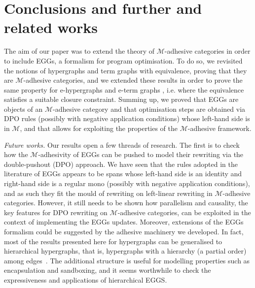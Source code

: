 \documentclass[3p]{elsarticle}
\theoremstyle{remark}
\theoremstyle{definition}
\begin{document}
\section{Conclusions and further and related works}
\label{conclusioni}
The aim of our paper was to extend the theory of $\mathcal{M}$-adhesive categories in order to include EGGs, 
a formalism for program optimisation. 
%
To do so, we revisited the notions of hypergraphs and term graphs with equivalence, 
proving that they are $\mathcal{M}$-adhesive categories, and we extended these results in order to
prove the same property for e-hypergraphs and e-term graphs , i.e. where the equivalence satisfies 
a suitable closure constraint.
Summing up, we proved that EGGs are objects of an $\mathcal{M}$-adhesive category
and that optimisation steps are obtained via DPO rules (possibly with negative application conditions) whose 
left-hand side is in $\mathcal{M}$,
and that allows for exploiting the properties 
of the $\mathcal{M}$-adhesive framework.

\emph{Future works.}
Our results open a few threads of research. The first is to check how the $\mathcal{M}$-adhesivity 
of EGGs can be pushed to model their rewriting via the double-pushout (DPO) approach. We have seen that 
the rules adopted in the literature of EGGs appears to be spans whose left-hand side is an identity and 
right-hand side is a regular mono (possibly with negative application 
conditions), and as such they fit the mould of rewriting on left-linear rewriting in $\mathcal{M}$-adhesive categories. 
%
However, it still needs to be shown how parallelism and causality, the key features for DPO rewriting
on $\mathcal{M}$-adhesive categories, can be exploited in the context of implementing the 
EGGs updates. 
Moreover, extensions of the EGGs formalism could be suggested by the adhesive 
machinery we developed.
In fact, most of the results
presented here for hypergraphs can be generalised to hierarchical hypergraphs, that is, 
hypergraphs with a hierarchy (a partial order) among 
edges~\cite{ghicaZan,CastelnovoGM24}.
The additional structure is useful for modelling properties such as encapsulation and sandboxing,
and it seems worthwhile to check the expressiveness and applications of hierarchical EGGS.
\end{document}
